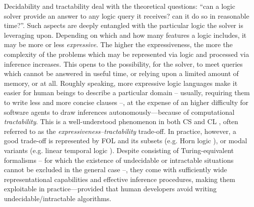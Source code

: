 \documentclass[12pt,a4paper,openright,twoside]{book}
\begin{document}
Decidability and tractability deal with the theoretical questions: ``can a logic solver provide an answer to any logic query it receives? can it do so in reasonable time?''.
%
Such aspects are deeply entangled with the particular logic the solver is leveraging upon.
%
Depending on which and how many features a logic includes, it may be more or less \emph{expressive}.
%
The higher the expressiveness, the more the complexity of the problems which may be represented via logic and processed via inference increases.
%
This opens to the possibility, for the solver, to meet queries which cannot be answered in useful time, or relying upon a limited amount of memory, or at all.
%
Roughly speaking, more expressive logic languages make it easier for human beings to describe a particular domain -- usually, requiring them to write less and more concise clauses --, at the expense of an higher difficulty for software agents to draw inferences autonomously---because of computational \emph{tractability}.
%
This is a well-understood phenomenon in both CS and CL \cite{LevesqueB87, BrachmanL2004}, often referred to as the \emph{expressiveness--tractability} trade-off.
%
In practice, however, a good trade-off is represented by FOL and its subsets (e.g. Horn logic \cite{Makowsky1987}), or modal variants (e.g. linear temporal logic \cite{Pnueli77}).
%
Despite consisting of Turing-equivalent formalisms -- for which the existence of undecidable or intractable situations cannot be excluded in the general case --, they come with sufficiently wide representational capabilities and effective inference procedures, making them exploitable in practice---provided that human developers avoid writing undecidable/intractable algorithms.


\end{document}
